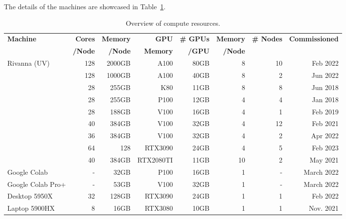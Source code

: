 \documentclass[utf8]{FrontiersinVancouver} %
\begin{document}
The details of the machines are showcased in Table~\ref{tab:hwoverview}.

\begin{table}[htb]
    \caption{Overview of compute resources.}
    \label{tab:hwoverview}
    \begin{center}
    {\footnotesize
    \begin{tabular}{|l|r|r|r|r|r|r|r|}
        \hline
            {\bf Machine}  & {\bf Cores} & {\bf Memory} & {\bf GPU}   &   {\bf \# GPUs} & {\bf Memory} & {\bf \# Nodes}  & {\bf Commissioned} \\ 
                     &  {\bf /Node} & {\bf /Node}  &  {\bf Memory} & {\bf /GPU}     &   {\bf /Node}        & & \\
        \hline
        \hline
        Rivanna (UV)    & 128 & 2000GB   & A100 & 80GB &  8  & 10 & Feb 2022 \\
                        & 128 & 1000GB   & A100 & 40GB &  8  &  2 & Jun 2022  \\   
                        & 28  & 255GB    & K80  & 11GB &  8  &  8 & Jun 2018         \\
                        & 28  & 255GB    & P100 & 12GB &  4  &  4 & Jan 2018         \\
                        & 28  & 188GB    & V100 & 16GB &  4  &  1 & Feb 2019          \\
                        & 40  & 384GB    & V100 & 32GB &  4  & 12 & Feb 2021          \\
                        & 36  & 384GB    & V100 & 32GB &  4  &  2 & Apr 2022          \\
                        &  64 & 128     & RTX3090   & 24GB    & 4   &  5 & Feb 2023         \\
                        & 40  & 384GB    & RTX2080TI & 11GB & 10  &  2 & May 2021 \\                        
         \hline
         Google Colab      & -   & 32GB      & P100      & 16GB    & 1 & - & March 2022 \\
         Google Colab Pro+ & -   & 53GB      & V100      & 32GB    & 1 & - & March 2022 \\
         \hline
         Desktop 5950X     &  32 & 128GB     & RTX3090   & 24GB    & 1 & 1 & Feb 2022   \\
         \hline
         Laptop 5900HX     &   8 & 16GB      & RTX3080   & 10GB    & 1 & 1 & Nov. 2021 \\
         \hline
    \end{tabular}
    }
    \end{center}


\end{table}
\end{document}
